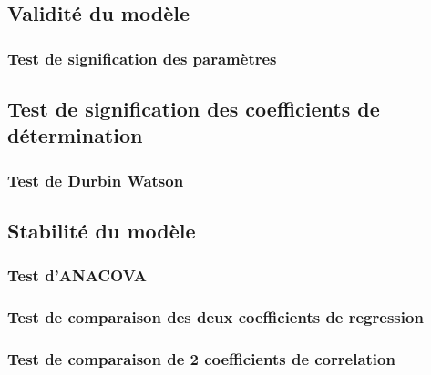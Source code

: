 \documentclass[A4paper]{article}
\begin{document}
\subsection{Validité du modèle}
\subsubsection{Test de signification des paramètres}
\subsection{Test de signification des coefficients de détermination}
\subsubsection{Test de Durbin Watson}
\subsection{Stabilité du modèle}
\subsubsection{Test d'ANACOVA}
\subsubsection{Test de comparaison des deux coefficients de regression}
\subsubsection{Test de comparaison de 2 coefficients de correlation}
\end{document}
